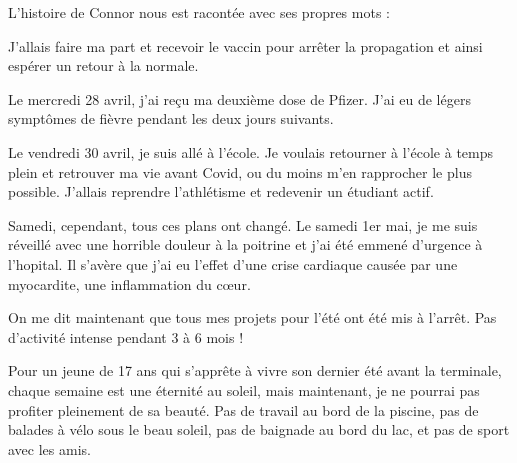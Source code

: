 L'histoire de Connor nous est racontée avec ses propres mots :

J'allais faire ma part et recevoir le vaccin pour arrêter la propagation et
ainsi espérer un retour à la normale.

Le mercredi 28 avril, j'ai reçu ma deuxième dose de Pfizer. J'ai eu de légers
symptômes de fièvre pendant les deux jours suivants.

Le vendredi 30 avril, je suis allé à l'école. Je voulais retourner à l'école à
temps plein et retrouver ma vie avant Covid, ou du moins m'en rapprocher le plus
possible. J'allais reprendre l'athlétisme et redevenir un étudiant actif.

Samedi, cependant, tous ces plans ont changé. Le samedi 1er mai, je me suis
réveillé avec une horrible douleur à la poitrine et j'ai été emmené d'urgence à
l'hopital. Il s'avère que j'ai eu l'effet d'une crise cardiaque causée par une
myocardite, une inflammation du cœur.

On me dit maintenant que tous mes projets pour l'été ont été mis à l'arrêt. Pas
d'activité intense pendant 3 à 6 mois !

Pour un jeune de 17 ans qui s'apprête à vivre son dernier été avant la
terminale, chaque semaine est une éternité au soleil, mais maintenant, je ne
pourrai pas profiter pleinement de sa beauté. Pas de travail au bord de la
piscine, pas de balades à vélo sous le beau soleil, pas de baignade au bord du
lac, et pas de sport avec les amis.

